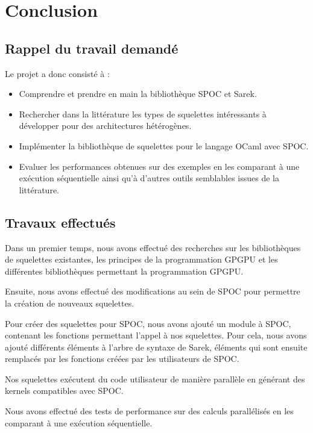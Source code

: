 \documentclass{report}
\begin{document}
\chapter{Conclusion}
\section{Rappel du travail demandé}

Le projet a donc consisté à : \newline
\begin{itemize}
\item Comprendre et prendre en main la bibliothèque SPOC et Sarek.
\item Rechercher dans la littérature les types de squelettes intéressants à développer  pour des architectures hétérogènes.
\item Implémenter la bibliothèque de squelettes pour le langage OCaml avec SPOC.
\item Evaluer les performances obtenues sur des exemples en les comparant à une exécution séquentielle ainsi qu'à d'autres outils semblables issues de la littérature. 
\end{itemize}

\section{Travaux effectués}
Dans un premier temps, nous avons effectué des recherches sur les bibliothèques de squelettes existantes, les principes de la programmation GPGPU et les différentes bibliothèques permettant la programmation GPGPU.\newline

Ensuite, nous avons effectué des modifications au sein de SPOC pour permettre la création de nouveaux squelettes.\newline

Pour créer des squelettes pour SPOC, nous avons ajouté un module à SPOC, contenant les fonctions permettant l'appel à nos squelettes. Pour cela, nous avons ajouté différents éléments à l'arbre de syntaxe de Sarek, éléments qui sont ensuite remplacés par les fonctions créées par les utilisateurs de SPOC.\newline

Nos squelettes exécutent du code utilisateur de manière parallèle en générant des kernels compatibles avec SPOC.\newline

Nous avons effectué des tests de performance sur des calculs parallélisés en les comparant à une exécution séquentielle.\newline
\end{document}

